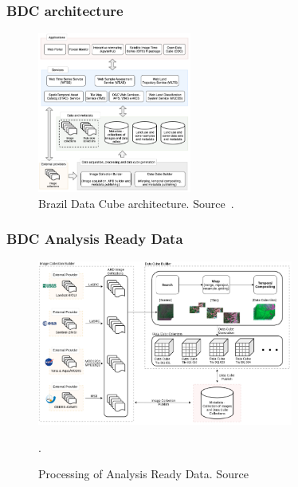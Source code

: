 \documentclass[aspectratio=169]{beamer}
\begin{document}
\begin{frame}
    \frametitle{BDC architecture}
    \begin{figure}
        \centering
        \includegraphics[width=0.45\textwidth]
        {img/brazil_data_cube_architecture.png}
        \caption{Brazil Data Cube architecture. Source~\cite{ferreira2020a}.}
        \label{fig:brazil_data_cube_architecture}
    \end{figure}
\end{frame}



\begin{frame}
    \frametitle{BDC Analysis Ready Data}
    \begin{figure}
        \centering
        \includegraphics[width=0.75\textwidth]
        {img/analysis_ready_data_processing.png}
        \caption{Processing of Analysis Ready Data. 
        Source~\cite{ferreira2020a}}.
        \label{fig:analysis_ready_data_processing}
    \end{figure}
\end{frame}
\end{document}
